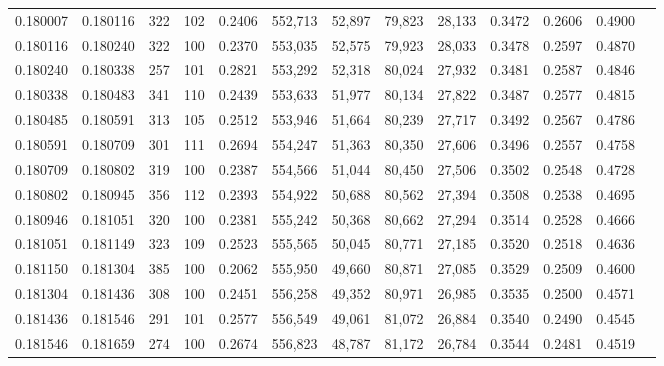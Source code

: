 \begin{tabular}{rrrrrrrrrrrrr}
0.180007 & 0.180116 &   322 & 102 &                                     0.2406 & 552,713 &  52,897 &  79,823 &  28,133 & 0.3472 & 0.2606 & 0.4900 \\
0.180116 & 0.180240 &   322 & 100 &                                     0.2370 & 553,035 &  52,575 &  79,923 &  28,033 & 0.3478 & 0.2597 & 0.4870 \\
0.180240 & 0.180338 &   257 & 101 &                                     0.2821 & 553,292 &  52,318 &  80,024 &  27,932 & 0.3481 & 0.2587 & 0.4846 \\
0.180338 & 0.180483 &   341 & 110 &                                     0.2439 & 553,633 &  51,977 &  80,134 &  27,822 & 0.3487 & 0.2577 & 0.4815 \\
0.180485 & 0.180591 &   313 & 105 &                                     0.2512 & 553,946 &  51,664 &  80,239 &  27,717 & 0.3492 & 0.2567 & 0.4786 \\
0.180591 & 0.180709 &   301 & 111 &                                     0.2694 & 554,247 &  51,363 &  80,350 &  27,606 & 0.3496 & 0.2557 & 0.4758 \\
0.180709 & 0.180802 &   319 & 100 &                                     0.2387 & 554,566 &  51,044 &  80,450 &  27,506 & 0.3502 & 0.2548 & 0.4728 \\
0.180802 & 0.180945 &   356 & 112 &                                     0.2393 & 554,922 &  50,688 &  80,562 &  27,394 & 0.3508 & 0.2538 & 0.4695 \\
0.180946 & 0.181051 &   320 & 100 &                                     0.2381 & 555,242 &  50,368 &  80,662 &  27,294 & 0.3514 & 0.2528 & 0.4666 \\
0.181051 & 0.181149 &   323 & 109 &                                     0.2523 & 555,565 &  50,045 &  80,771 &  27,185 & 0.3520 & 0.2518 & 0.4636 \\
0.181150 & 0.181304 &   385 & 100 &                                     0.2062 & 555,950 &  49,660 &  80,871 &  27,085 & 0.3529 & 0.2509 & 0.4600 \\
0.181304 & 0.181436 &   308 & 100 &                                     0.2451 & 556,258 &  49,352 &  80,971 &  26,985 & 0.3535 & 0.2500 & 0.4571 \\
0.181436 & 0.181546 &   291 & 101 &                                     0.2577 & 556,549 &  49,061 &  81,072 &  26,884 & 0.3540 & 0.2490 & 0.4545 \\
0.181546 & 0.181659 &   274 & 100 &                                     0.2674 & 556,823 &  48,787 &  81,172 &  26,784 & 0.3544 & 0.2481 & 0.4519 \\

\end{tabular}

